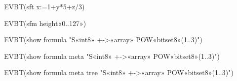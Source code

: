 \documentclass[10pt,a4paper]{article}
\begin{document}
EVBT(sft x:=1+y*5+z/3)

EVBT(sfm height«0..127»)

EVBT(show formula "S«int8» +->«array» POW«bitset8»(1..3)")

EVBT(show formula meta "S«int8» +->«array» POW«bitset8»(1..3)")

EVBT(show formula meta tree "S«int8» +->«array» POW«bitset8»(1..3)")
\end{document}
